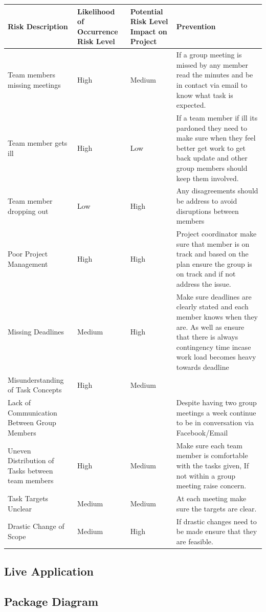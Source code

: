 \documentclass[11pt]{article}
\begin{document}
	\begin{tabular}{|m{5cm}|m{2cm}|m{2.5cm}|m{6cm}|}
		\hline
	\textbf{Risk Description} & \textbf{Likelihood of Occurrence Risk Level} & \textbf{Potential Risk Level Impact on Project} & \textbf{Prevention}\\ \hline 
	Team members missing meetings & High & Medium & If a group meeting is missed by any member read the minutes and be in contact via email to know what task is expected. \\ \hline
	Team member gets ill & High & Low & If a team member if ill its pardoned they need to make sure when they feel better get work to get back update and other group members should keep them involved. \\ \hline
	Team member dropping out & Low & High & Any disagreements should be address to avoid disruptions between members \\ \hline
	Poor Project Management& High & High& Project coordinator make sure that member is on track and based on the plan ensure the group is on track and if not address the issue.\\ \hline
	Missing Deadlines& Medium & High & Make sure deadlines are clearly stated and each member knows when they are. As well as ensure that there is always contingency time incase work load becomes heavy towards deadline\\ \hline
	Misunderstanding of Task Concepts& High & Medium& \\ \hline
	Lack of Communication Between Group Members& & & Despite having two group meetings a week continue to be in conversation via Facebook/Email \\ \hline
	Uneven Distribution of Tasks between team members& High & Medium& Make sure each team member is comfortable with the tasks given, If not within a group meeting raise concern.\\ \hline
	Task Targets Unclear & Medium & Medium & At each meeting make sure the targets are clear.\\ \hline
	Drastic Change of Scope& Medium& High & If drastic changes need to be made ensure that they are feasible.\\ \hline
	\end{tabular}
	\subsection{Live Application}
	\subsection{Package Diagram}
\end{document}
